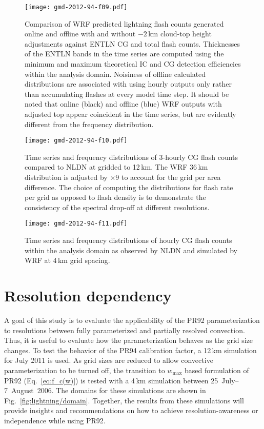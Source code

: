 \begin{figure*}[t]
\texttt{[image: gmd-2012-94-f09.pdf]}
\caption{Comparison of WRF predicted lightning flash counts generated online
and offline with and without $-2$\,\unit{km} cloud-top height adjustments
against ENTLN CG and total flash counts. Thicknesses of the ENTLN bands in
the time series are computed using the minimum and maximum theoretical IC and
CG detection efficiencies within the analysis domain. Noisiness of offline
calculated distributions are associated with using hourly outputs only rather
than accumulating flashes at every model time step. It should be noted that
online (black) and offline (blue) WRF outputs with adjusted top appear
coincident in the time series, but are evidently different from the frequency
distribution.}
      \label{fig:lightning/offcompare}
\end{figure*}

\begin{figure}[t]
      \texttt{[image: gmd-2012-94-f10.pdf]}
      \caption{Time series and frequency distributions of 3-hourly CG flash counts compared to NLDN at gridded to 12\,\unit{km}.
      The WRF 36\,\unit{km} distribution is adjusted by $\times9$ to account for the grid per area difference. The choice of
      computing the distributions for flash rate per grid as opposed to flash density is to demonstrate the consistency of
      the spectral drop-off at different resolutions.}
      \label{fig:lightning/gabiseries}
\end{figure}

\begin{figure}[t]
      \texttt{[image: gmd-2012-94-f11.pdf]}
      \caption{Time series and frequency distributions of hourly CG flash counts within
      the analysis domain as observed by NLDN and simulated by WRF at 4\,\unit{km} grid spacing.}
      \label{fig:lightning/4kmseries}
\end{figure}

\section{Resolution dependency}\label{sec:lightning/resolution}

A goal of this study is to evaluate the applicability of the PR92
parameterization to resolutions between fully parameterized and partially
resolved convection. Thus, it is useful to evaluate how the parameterization
behaves as the grid size changes. To test the behavior of the PR94
calibration factor, a 12\,\unit{km} simulation for July 2011 is used. As grid
sizes are reduced to allow convective parameterization to be turned off, the
transition to $w_{\max}$ based formulation of PR92 (Eq.~\ref{eq:f_c(w)}) is
tested with a 4\,\unit{km} simulation between 25~July--7~August~2006. The
domains for these simulations are shown in Fig.~\ref{fig:lightning/domain}. Together,
the results from these simulations will provide insights and recommendations
on how to achieve resolution-awareness or independence while using PR92.

